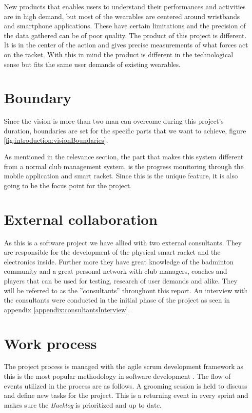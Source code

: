 New products that enables users to understand their performances and activities are in high demand, but most of the wearables are centered around wristbands and smartphone applications.
These have certain limitations and the precision of the data gathered can be of poor quality.
The product of this project is different.
It is in the center of the action and gives precise measurements of what forces act on the racket.
With this in mind the product is different in the technological sense but fits the same user demands of existing wearables.

\section*{Boundary}
Since the vision is more than two man can overcome during this project's duration, boundaries are set for the specific parts that we want to achieve, figure \ref{fig:introduction:visionBoundaries}.

As mentioned in the relevance section, the part that makes this system different from a normal club management system, is the progress monitoring through the mobile application and smart racket.
Since this is the unique feature, it is also going to be the focus point for the project.


\section*{External collaboration}
As this is a software project we have allied with two external consultants.
They are responsible for the development of the physical smart racket and the electronics inside.
Further more they have great knowledge of the badminton community and a great personal network with club managers, coaches and players that can be used for testing, research of user demands and alike.
They will be referred to as the ''consultants'' throughout this report.
An interview with the consultants were conducted in the initial phase of the project as seen in appendix \ref{appendix:consultantsInterview}.

\section*{Work process}
The project process is managed with the agile \gls{scrum} development framework as this is the most popular methodology in software development \citep{introduction:work:scrum}. 
The flow of events utilized in the process are as follows.
A grooming session is held to discuss and define new tasks for the project.
This is a returning event in every sprint and makes sure the \textit{Backlog} is prioritized and up to date.

